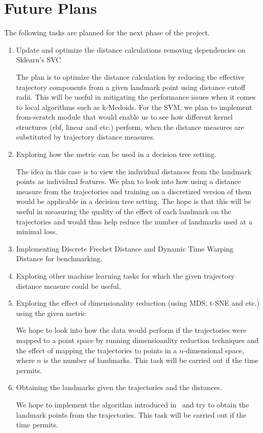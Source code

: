 \documentclass[11pt,a4paper,twocolumn]{article}%
\begin{document}
\section{Future Plans}\label{sec:fut}

The following tasks are planned for the next phase of the project.
\begin{enumerate}
    \item Update and optimize the distance calculations removing dependencies on Sklearn's SVC
    
    The plan is to optimize the distance calculation by reducing the effective trajectory components from a given landmark point using distance cutoff radii. This will be useful in mitigating the performance issues when it comes to local algorithms such as k-Medoids. For the SVM, we plan to implement from-scratch module that would enable us to see how different kernel structures (rbf, linear and etc.) perform, when the distance measures are substituted by trajectory distance measures.
    
    
    \item Exploring how the metric can be used in a decision tree setting.
    
    The idea in this case is to view the individual distances from the landmark points as individual features. We plan to look into how using a distance measure from the trajectories and training on a discretized version of them would be applicable in a decision tree setting. The hope is that this will be useful in measuring the quality of the effect of each landmark on the trajectories and would thus help reduce the number of landmarks used at a minimal loss. 
    
    \item Implementing Discrete Frechet Distance and Dynamic Time Warping Distance for benchmarking.
    
    \item Exploring other machine learning tasks for which the given trajectory distance measure could be useful.
    
    \item Exploring the effect of dimensionality reduction (using MDS, t-SNE and etc.) using the given metric
    
    We hope to look into how the data would perform if the trajectories were mapped to a point space by running dimensioanlity reduction techniques and the effect of mapping the trajectories to points in a $n$-dimensional space, where $n$ is the number of landmarks. This task will be carried out if the time permits.
    
    \item Obtaining the landmarks given the trajectories and the distances.
    
    We hope to implement the algorithm introduced in~\citep{phillips2019sketched}  and try to obtain the landmark points from the trajectories. This task will be carried out if the time permits.
\end{enumerate}

%

\end{document}
